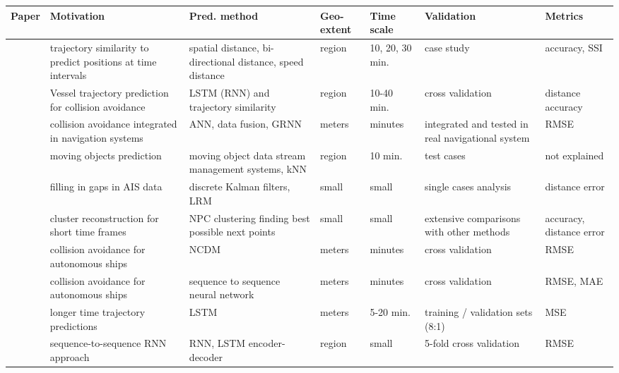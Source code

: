 \noindent
\begin{table}[htbp]
{\small\begin{tabularx}{1.2\textwidth}{p{0.6in} X X p{0.5in} p{0.4in} X p{0.5in}}
    \toprule
    \textbf{Paper} & \textbf{Motivation} & \textbf{Pred. method} & \textbf{Geo-extent} & \textbf{Time scale} & \textbf{Validation} & \textbf{Metrics} \\ \midrule
    \cite{Alizadeh2020PredictionTrajectory} & trajectory similarity to predict positions at time intervals & spatial distance, bi-directional distance, speed distance & region & 10, 20, 30 min. & case study & accuracy, SSI \\ \midrule
    \cite{Alizadeh2021VesselData} & Vessel trajectory prediction for collision avoidance & LSTM (RNN) and trajectory similarity & region & 10-40 min. & cross validation & distance accuracy \\ \midrule
    \cite{Borkowski2017TheFusion} & collision avoidance integrated in navigation systems & ANN, data fusion, GRNN & meters & minutes & integrated and tested in real navigational system & RMSE \\ \midrule
    \cite{Brandt2017MovingPrediction} & moving objects prediction & moving object data stream management systems, kNN  & region & 10 min. & test cases & not explained \\ \midrule
    \cite{Burger2020DiscretePrediction} & filling in gaps in AIS data & discrete Kalman filters, LRM & small & small & single cases analysis & distance error \\ \midrule
    \cite{Chen2020ThePrediction} & cluster reconstruction for short time frames & NPC clustering finding best possible next points & small & small & extensive comparisons with other methods & accuracy, distance error \\ \midrule
    \cite{Dalsnes2018ThePrediction} & collision avoidance for autonomous ships & NCDM & meters & minutes & cross validation & RMSE \\ \midrule
    \cite{Dijt2020TrajectoryShips} & collision avoidance for autonomous ships & sequence to sequence neural network & meters & minutes & cross validation & RMSE, MAE \\ \midrule
    \cite{DIng2020ALSTM} & longer time trajectory predictions & LSTM & meters & 5-20 min. & training / validation sets (8:1) & MSE \\ \midrule
    \cite{Forti2020PredictionNetworks} & sequence-to-sequence RNN approach & RNN, LSTM encoder-decoder & region & small & 5-fold cross validation & RMSE \\ \midrule

\end{tabularx}}
\end{table}
